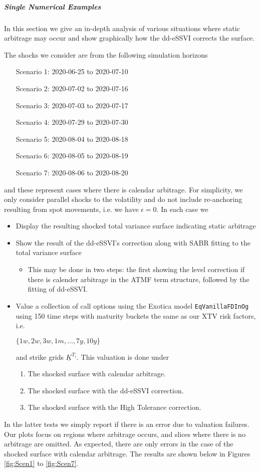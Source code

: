 \documentclass[11pt,letterpaper]{article}
\begin{document}
\subparagraph{Single Numerical Examples}

In this section we give an in-depth analysis of various situations where static arbitrage may occur and show graphically how the dd-eSSVI corrects the surface. 

The shocks we consider are from the following simulation horizons 
\begin{enumerate}[leftmargin=7.5em]
\item[Scenario 1:] 2020-06-25 to 2020-07-10 
\item[Scenario 2:] 2020-07-02 to 2020-07-16 
\item[Scenario 3:] 2020-07-03 to 2020-07-17 
\item[Scenario 4:] 2020-07-29 to 2020-07-30 
\item[Scenario 5:] 2020-08-04 to 2020-08-18
\item[Scenario 6:] 2020-08-05 to 2020-08-19
\item[Scenario 7:] 2020-08-06 to 2020-08-20
\end{enumerate}
and these represent cases where there is calendar arbitrage. For simplicity, we only consider parallel shocks to the volatility and do not include re-anchoring resulting from spot movements, i.e. we have $\epsilon = 0$. 
In each case we 
\begin{itemize}
\item Display the resulting shocked total variance surface indicating static arbitrage 
\item Show the result of the dd-eSSVI's correction along with SABR fitting to the total variance surface
\begin{itemize}
\item This may be done in two steps: the first showing the level correction if there is calender arbitrage in the ATMF term structure, followed by the fitting of dd-eSSVI. 
\end{itemize}
\item Value a collection of call options using the Exotica model \texttt{EqVanillaFDInOg} using 150 time steps with maturity buckets the same as our XTV risk factors, i.e. 
\begin{center}
$\{1w, 2w, 3w, 1m, \ldots, 7y , 10y \}$
\end{center}
and strike grids $\underline{K}^{T_i}$. This valuation is done under
\begin{enumerate}
\item The shocked surface with calendar arbitrage.
\item The shocked surface with the dd-eSSVI correction.
\item The shocked surface with the High Tolerance correction.
\end{enumerate}
\end{itemize}
In the latter tests we simply report if there is an error due to valuation failures. Our plots focus on regions where arbitrage occurs, and slices where there is no arbitrage are omitted. As expected, there are only errors in the case of the shocked surface with calendar arbitrage. The results are shown below in Figures \ref{fig:Scen1} to \ref{fig:Scen7}. 
\end{document}

